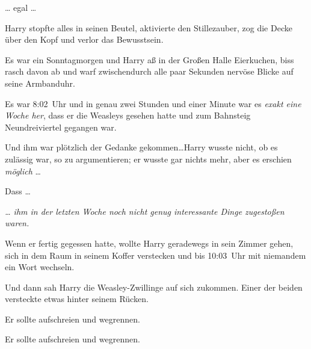 … egal …

Harry stopfte alles in seinen Beutel, aktivierte den Stillezauber, zog die Decke über den Kopf und verlor das Bewusstsein.

\later

Es war ein Sonntagmorgen und Harry aß in der Großen Halle Eierkuchen, biss rasch davon ab und warf zwischendurch alle paar Sekunden nervöse Blicke auf seine Armbanduhr.

Es war 8:02~Uhr und in genau zwei Stunden und einer Minute war es \emph{exakt eine Woche her}, dass er die Weasleys gesehen hatte und zum Bahnsteig Neundreiviertel gegangen war.

Und ihm war plötzlich der Gedanke gekommen…Harry wusste nicht, ob es zulässig war, so zu argumentieren; er wusste gar nichts mehr, aber es erschien \emph{möglich} …

Dass …

\emph{… ihm in der letzten Woche noch nicht genug interessante Dinge zugestoßen waren.}

Wenn er fertig gegessen hatte, wollte Harry geradewegs in sein Zimmer gehen, sich in dem Raum in seinem Koffer verstecken und bis 10:03~Uhr mit niemandem ein Wort wechseln.

Und dann sah Harry die Weasley-Zwillinge auf sich zukommen. Einer der beiden versteckte etwas hinter seinem Rücken.

Er sollte aufschreien und wegrennen.

Er sollte aufschreien und wegrennen.

